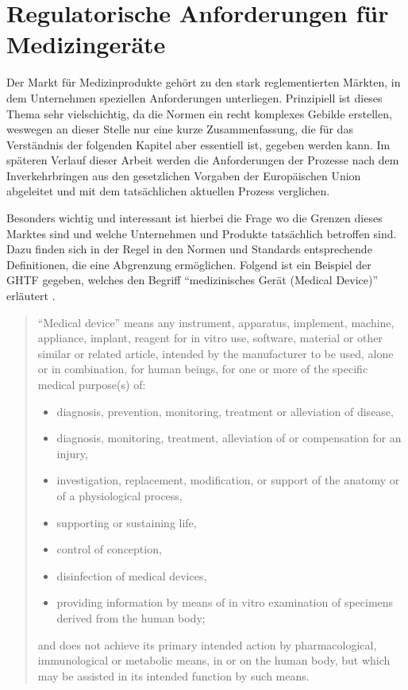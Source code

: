 \documentclass[a4paper,12pt]{report}
\begin{document}
\section{Regulatorische Anforderungen für Medizingeräte}\label{sec:RegRequ}
Der Markt für Medizinprodukte gehört zu den stark reglementierten Märkten, in dem Unternehmen speziellen Anforderungen unterliegen. Prinzipiell ist dieses Thema sehr vielschichtig, da die Normen ein recht komplexes Gebilde erstellen, weswegen an dieser Stelle nur eine kurze Zusammenfassung, die für das Verständnis der folgenden Kapitel aber essentiell ist, gegeben werden kann. Im späteren Verlauf dieser Arbeit werden die Anforderungen der Prozesse nach dem Inverkehrbringen aus den gesetzlichen Vorgaben der Europäischen Union abgeleitet und mit dem tatsächlichen aktuellen Prozess verglichen.

Besonders wichtig und interessant ist hierbei die Frage wo die Grenzen dieses Marktes sind und welche Unternehmen und Produkte tatsächlich betroffen sind. Dazu finden sich in der Regel in den Normen und Standards entsprechende Definitionen, die eine Abgrenzung ermöglichen. Folgend ist ein Beispiel der \ac{GHTF} gegeben, welches den Begriff "`medizinisches Gerät (Medical Device)"' erläutert \citep[][S. 6]{GHTF2012}.
\begin{quote}
"`Medical device"' means any instrument, apparatus, implement, machine, appliance, implant, reagent for in vitro use, software, material or other similar or related article, intended by the manufacturer to be used, alone or in combination, for human beings, for one or more of the specific medical purpose(s) of:
\begin{itemize}
\item diagnosis, prevention, monitoring, treatment or alleviation of disease,
\item diagnosis, monitoring, treatment, alleviation of or compensation for an injury,
\item investigation, replacement, modification, or support of the anatomy or of a physiological process,
\item supporting or sustaining life,
\item control of conception,
\item disinfection of medical devices,
\item providing information by means of in vitro examination of specimens derived from the human body;
\end{itemize}
and does not achieve its primary intended action by pharmacological, immunological or metabolic means, in or on the human body, but which may be assisted in its intended function by such means.
\end{quote}
\end{document}
